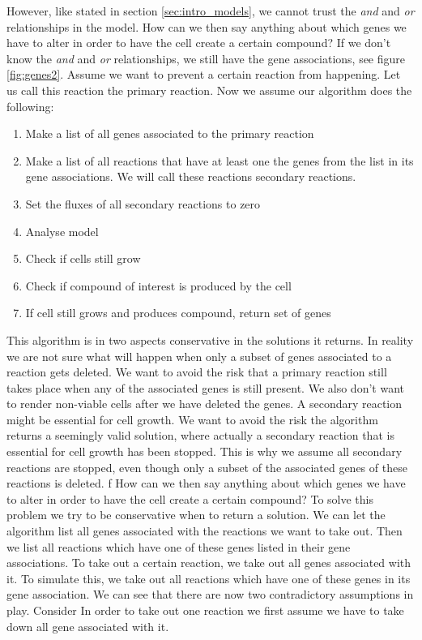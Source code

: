 \documentclass[12pt]{report}
\begin{document}
However, like stated in section \ref{sec:intro_models}, we cannot trust the \emph{and} and \emph{or} relationships in the model.
How can we then say anything about which genes we have to alter in order to have the cell create a certain compound?
If we don't know the \emph{and} and \emph{or} relationships, we still have the gene associations, see figure \ref{fig:genes2}.
Assume we want to prevent a certain reaction from happening. Let us call this reaction the primary reaction. Now we assume our algorithm does the following:
\begin{enumerate}
\item Make a list of all genes associated to the primary reaction
\item Make a list of all reactions that have at least one the genes from the list in its gene associations. We will call these reactions secondary reactions.
\item Set the fluxes of all secondary reactions to zero
\item Analyse model
\item Check if cells still grow
\item Check if compound of interest is produced by the cell
\item If cell still grows and produces compound, return set of genes
\end{enumerate}

This algorithm is in two aspects conservative in the solutions it returns.
In reality we are not sure what will happen when only a subset of genes associated to a reaction gets deleted. We want to avoid the risk that a primary reaction still takes place when any of the associated genes is still present. We also don't want to render non-viable cells after we have deleted the genes. A secondary reaction might be essential for cell growth. We want to avoid the risk the algorithm returns a seemingly valid solution, where actually a secondary reaction that is essential for cell growth has been stopped. This is why we assume all secondary reactions are stopped, even though only a subset of the associated genes of these reactions is deleted.
f
How can we then say anything about which genes we have to alter in order to have the cell create a certain compound?
To solve this problem we try to be conservative when to return a solution. We can let the algorithm list all genes associated with the reactions we want to take out. Then we list all reactions which have one of these genes listed in their gene associations. To take out a certain reaction, we take out all genes associated with it. To simulate this, we take out all reactions which have one of these genes in its gene association. We can see that there are now two contradictory assumptions in play. Consider  In order to take out one reaction we first assume we have to take down all gene associated with it.
\end{document}
